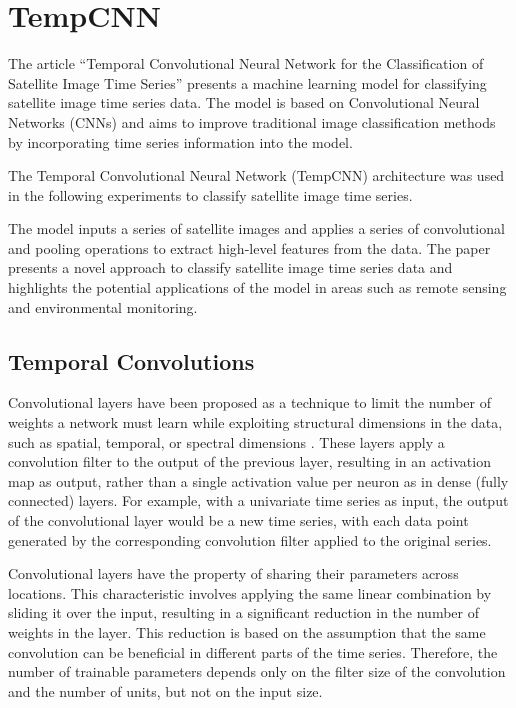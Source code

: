 \section{TempCNN}

The article ``Temporal Convolutional Neural Network for the Classification of Satellite Image Time Series'' \cite{tempCNN} presents a machine learning model for classifying satellite image time series data.
The model is based on Convolutional Neural Networks (CNNs) and aims to improve traditional image classification methods by incorporating time series information into the model.

The Temporal Convolutional Neural Network (TempCNN) architecture was used in the following experiments to classify satellite image time series.

The model inputs a series of satellite images and applies a series of convolutional and pooling operations to extract high-level features from the data.
The paper presents a novel approach to classify satellite image time series data and highlights the potential applications of the model in areas such as remote sensing and environmental monitoring.

\subsection{Temporal Convolutions}
Convolutional layers have been proposed as a technique to limit the number of weights a network must learn while exploiting structural dimensions in the data, such as spatial, temporal, or spectral dimensions \cite{NIPS1989_53c3bce6}. 
These layers apply a convolution filter to the output of the previous layer, resulting in an activation map as output, rather than a single activation value per neuron as in dense (fully connected) layers.
For example, with a univariate time series as input, the output of the convolutional layer would be a new time series, with each data point generated by the corresponding convolution filter applied to the original series.

Convolutional layers have the property of sharing their parameters across locations.
This characteristic involves applying the same linear combination by sliding it over the input, resulting in a significant reduction in the number of weights in the layer. 
This reduction is based on the assumption that the same convolution can be beneficial in different parts of the time series.
Therefore, the number of trainable parameters depends only on the filter size of the convolution and the number of units, but not on the input size.

